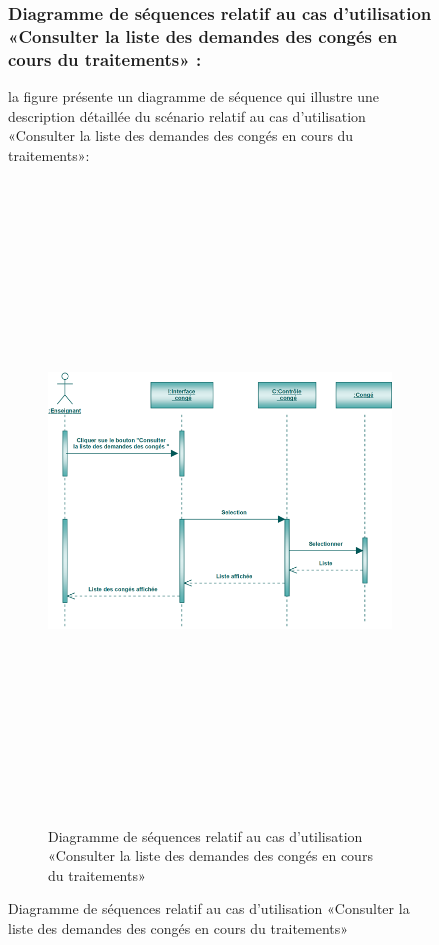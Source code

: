\documentclass[12 pt]{report}
\begin{document}
\begin{figure}[h]
\begin{center}
\subsubsection{Diagramme de séquences relatif au cas d’utilisation «Consulter la liste des demandes des congés en cours du traitements» :}
la figure   présente un diagramme de séquence qui illustre une description détaillée du scénario relatif au cas d’utilisation «Consulter la liste des demandes des congés en cours du traitements»: 
\begin{figure}[h]
 \begin{center}
\includegraphics[width= 18 cm ,height=  17cm]{scc.PNG}
\caption{Diagramme de séquences relatif au cas d’utilisation «Consulter la liste des demandes des congés en cours du traitements»}

\end{center}
\end{figure}

\end{center}
\end{figure}
\end{document}
